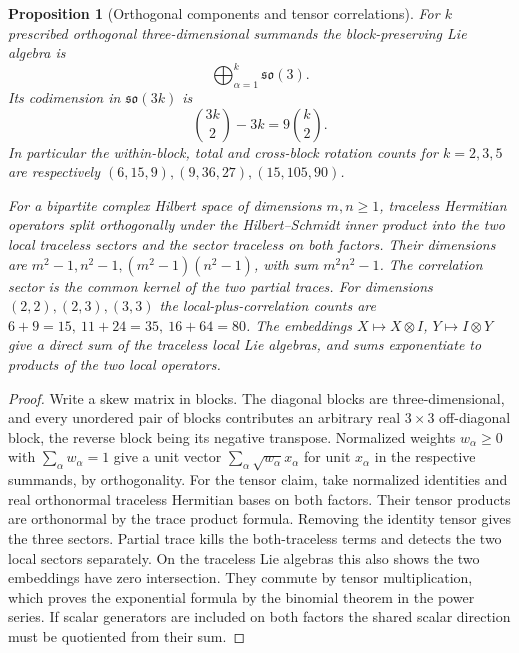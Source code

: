\documentclass[11pt,reqno]{amsart}
\newtheorem{proposition}[theorem]{Proposition}
\theoremstyle{definition}
\theoremstyle{remark}
\numberwithin{equation}{section}
\begin{document}
\begin{proposition}[Orthogonal components and tensor correlations]
\label{m10:blocks}
For \(k\) prescribed orthogonal three-dimensional summands the
block-preserving Lie algebra is
\[
 \bigoplus_{\alpha=1}^k\mathfrak{so}(3).
\]
Its codimension in \(\mathfrak{so}(3k)\) is
\[
 \binom{3k}{2}-3k=9\binom{k}{2}.
\]
In particular the within-block, total and cross-block rotation
counts for \(k=2,3,5\) are respectively
\((6,15,9),(9,36,27),(15,105,90)\).

For a bipartite complex Hilbert space of dimensions \(m,n\ge1\),
traceless Hermitian operators split orthogonally under the
Hilbert--Schmidt inner product into the two local traceless
sectors and the sector traceless on both factors. Their dimensions
are \(m^2-1,n^2-1,(m^2-1)(n^2-1)\), with sum \(m^2n^2-1\).
The correlation sector is the common kernel of the two partial
traces. For dimensions \((2,2),(2,3),(3,3)\) the local-plus-correlation
counts are \(6+9=15,\ 11+24=35,\ 16+64=80\).
The embeddings \(X\mapsto X\otimes I\), \(Y\mapsto I\otimes Y\)
give a direct sum of the traceless local Lie algebras, and sums
exponentiate to products of the two local operators.
\end{proposition}

\begin{proof}
Write a skew matrix in blocks. The diagonal blocks are
three-dimensional, and every unordered pair of blocks contributes
an arbitrary real \(3\times3\) off-diagonal block, the reverse
block being its negative transpose. Normalized weights
\(w_\alpha\ge0\) with \(\sum_\alpha w_\alpha=1\) give a unit
vector \(\sum_\alpha\sqrt{w_\alpha}x_\alpha\) for unit
\(x_\alpha\) in the respective summands, by orthogonality.
For the tensor claim, take normalized identities and real
orthonormal traceless Hermitian bases on both factors. Their
tensor products are orthonormal by the trace product formula.
Removing the identity tensor gives the three sectors. Partial
trace kills the both-traceless terms and detects the two local
sectors separately. On the traceless Lie algebras this also
shows the two embeddings have zero intersection. They commute
by tensor multiplication, which proves the exponential formula
by the binomial theorem in the power series. If scalar
generators are included on both factors the shared scalar
direction must be quotiented from their sum.
\end{proof}
\end{document}
